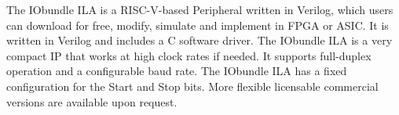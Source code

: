 The IObundle ILA is a RISC-V-based Peripheral written in Verilog, which users
can download for free, modify, simulate and implement in FPGA or ASIC. It is
written in Verilog and includes a C software driver. The IObundle ILA is a very
compact IP that works at high clock rates if needed. It supports full-duplex
operation and a configurable baud rate. The IObundle ILA has a fixed
configuration for the Start and Stop bits. More flexible licensable commercial
versions are available upon request.


